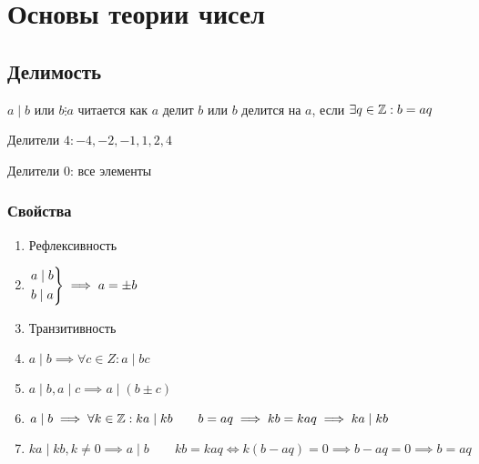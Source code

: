 \documentclass[main]{subfiles}
\begin{document}
\part{Основы теории чисел}
\chapter{Делимость}

$a \mid b$ или $b\vdots a$ читается как $a$ делит $b$ или $b$ делится на $a$,
если $\exists q \in \mathbb{Z}:b=aq$

\begin{example}
    Делители $4: -4, -2, -1, 1,2,4$

    Делители 0: все элементы \Z
\end{example}

\section{Свойства}
\begin{enumerate}
    \item Рефлексивность
    \item $\begin{rcases}
                  a \mid b \\
                  b \mid a
              \end{rcases} \implies a = \pm b$
    \item Транзитивность
    \item $a \mid b \implies \forall c \in Z: a \mid bc$
    \item $a \mid b, a\mid c \implies a\mid (b \pm c)$
    \item $a \mid  b \implies \forall k\in \mathbb{Z}: ka \mid kb \qquad b = aq \implies
              kb = kaq \implies ka \mid kb$
    \item $ka \mid kb, k \neq 0 \implies a \mid b \qquad kb = kaq \Leftrightarrow
              k(b-aq)=0 \implies b-aq=0 \implies b=aq$
\end{enumerate}
\end{document}
